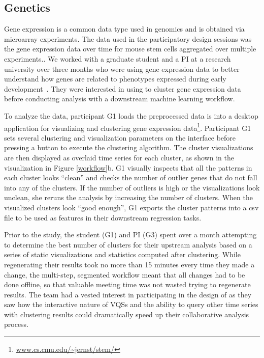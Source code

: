 \subsection{Genetics}
\par Gene expression is a common data type used in genomics and is obtained via microarray experiments.  The data used in the participatory design sessions was the gene expression data over time for mouse stem cells aggregated over multiple experiments.. We worked with a graduate student and a PI at a research university over three months who were using gene expression data to better understand how genes are related to phenotypes expressed during early development~\cite{Peng2016,Gloss2017}. They were interested in using \zv to cluster gene expression data before conducting analysis with a downstream machine learning workflow.
\par To analyze the data, participant G1 loads the preprocessed data is into a desktop application for visualizing and clustering gene expression data\footnote{\url{www.cs.cmu.edu/~jernst/stem/}}. Participant G1 sets several clustering and visualization parameters on the interface before pressing a button to execute the clustering algorithm. The cluster visualizations are then displayed as overlaid time series for each cluster, as shown in the visualization in Figure \ref{workflow}b. G1 visually inspects that all the patterns in each cluster looks ``clean'' and checks the number of outlier genes that do not fall into any of the clusters.  If the number of outliers is high or the visualizations look unclean, she reruns the analysis by increasing the number of clusters. When the visualized clusters look ``good enough'', G1 exports the cluster patterns into a csv file to be used as features in their downstream regression tasks.
\par Prior to the study, the student (G1) and PI (G3) spent over a month attempting to determine the best number of clusters for their upstream analysis based on a series of static visualizations and statistics computed after clustering. While regenerating their results took no more than 15 minutes every time they made a change, the multi-step, segmented workflow meant that all changes had to be done offline, so that valuable meeting time was not wasted trying to regenerate results. The team had a vested interest in participating in the design of \zv as they saw how the interactive nature of VQSs and the ability to query other time series with clustering results could dramatically speed up their collaborative analysis process.

